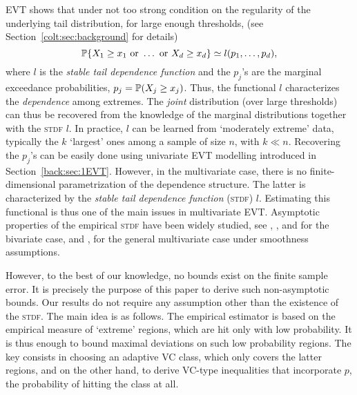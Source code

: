   \textsc{EVT} shows that under not too strong condition on the regularity of the underlying tail distribution, for large enough
  thresholds, (see Section~\ref{colt:sec:background} for details) 
\[
\P\{X_1 \ge x_1 \text{ or }  \dotsc \text{ or }
X_d\ge x_d \} \simeq 
l(p_1,\ldots,p_d), 
\]  
where $l$ is the  \emph{stable tail dependence function} and the
$p_j$'s  are the marginal exceedance probabilities, $p_j = \P(X_j\ge
x_j)$. Thus, the functional $l$  characterizes 
 the \emph{dependence} among extremes. The \emph{joint}   distribution
 (over large thresholds) 
 can thus be recovered from  the knowledge of the marginal distributions  together with
 the \textsc{stdf} $l$. In practice, $l$ can be learned %
 from
 `moderately extreme' data, typically the $k$   `largest' ones among a
 sample of size $n$, with $k\ll n$.
Recovering the $p_j$'s can be easily done using univariate \textsc{EVT} modelling introduced in Section~\ref{back:sec:1EVT}.
However, in the multivariate case, %
there is no finite-dimensional parametrization of the dependence
structure. 
The latter is characterized by %
the \emph{stable tail dependence function} (\textsc{stdf}) $l$.
 Estimating this functional is thus one of the main issues in multivariate \textsc{EVT}. Asymptotic properties of the empirical \textsc{stdf} have been widely studied, see \cite{Huangphd}, \cite{Drees98}, \cite{Embrechts2000} and \cite{dHF06} for the bivariate case, and \cite{Qi97}, \cite{Einmahl2012} for the general multivariate case under smoothness assumptions.

However, to the best of our knowledge, no bounds exist  %
on the finite sample error. It is precisely the purpose
of this paper to derive such non-asymptotic  bounds. Our results do
not require any assumption other than  the existence of the \textsc{stdf}.
The main idea is as follows. The empirical estimator is based on 
the empirical measure of `extreme' regions, which  are hit
 only with  low probability. It is thus enough to bound 
 maximal deviations on such low probability regions. The key consists
 in choosing an adaptive VC class, which only covers the
 latter regions, and on the other hand, to  derive  VC-type inequalities that incorporate $p$,
 the probability of hitting the class at all.%
 

